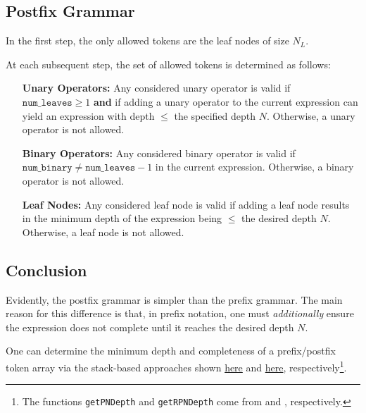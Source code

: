 \documentclass[runningheads]{llncs}
\begin{document}
\subsection{Postfix Grammar}\label{subsec:postfix_grammar}
In the first step, the only allowed tokens are the leaf nodes of size $N_L$.
\par At each subsequent step, the set of allowed tokens is determined as follows:
\begin{itemize}
\item[\textbf{Unary Operators:}]
Any considered unary operator is valid if $\texttt{num\_leaves} \geq 1$ \textbf{and} if adding a unary operator to the current expression can yield an expression with depth $\leq$ the specified depth $N$. Otherwise, a unary operator is not allowed.
\item[\textbf{Binary Operators:}]
Any considered binary operator is valid if $\texttt{num\_binary} \neq \texttt{num\_leaves} - 1$ in the current expression. Otherwise, a binary operator is not allowed.
\item[\textbf{Leaf Nodes:}]
Any considered leaf node is valid if adding a leaf node results in the minimum depth of the expression being $\leq$ the desired depth $N$. Otherwise, a leaf node is not allowed.
\end{itemize}

\subsection{Conclusion}
Evidently, the postfix grammar is simpler than the prefix grammar. The main reason for this difference is that, in prefix notation, one must \emph{additionally} ensure the expression does not complete until it reaches the desired depth $N$. \par One can determine the minimum depth and completeness of a prefix/postfix token array via the stack-based approaches shown \href{https://github.com/edfink234/Alpha-Zero-Symbolic-Regression/blob/0b5b6d0b56c2d108dda023a337edeb1084436da7/PrefixPostfixSR.cpp#L393-L485}{here} and \href{https://github.com/edfink234/Alpha-Zero-Symbolic-Regression/blob/0b5b6d0b56c2d108dda023a337edeb1084436da7/PrefixPostfixSR.cpp#L487-L641}{here}, respectively\footnote{The functions \texttt{getPNDepth} and \texttt{getRPNDepth} come from \cite{77180279} and \cite{77128902}, respectively.}.

\end{document}
